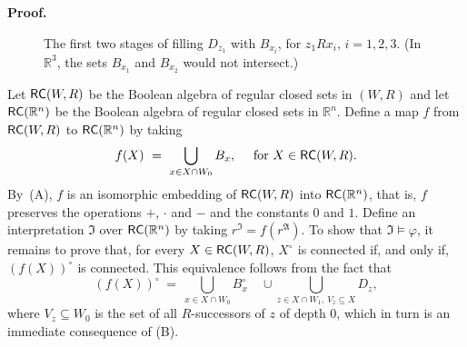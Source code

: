 \documentclass{article}
\newcommand{\R}{\mathbb{R}}
\newcommand{\RC}{{\sf RC}}
\newcommand{\ti}[2][]{{#2}^{\circ_{#1}}}
\newcommand{\qedsymbol}{\ding{113}}
\newenvironment{proof}{\par\noindent\textbf{Proof.}}{\mbox{}\hfill\qedsymbol\par\bigskip}
\begin{document}
\begin{proof}
\begin{figure}[h]
\begin{center}
\end{center}
\caption{The first two stages of filling $D_{z_1}$ with $B_{x_i}$, for $z_1 R x_i$, $i = 1,2,3$. (In $\R^3$, the sets $B_{x_1}$ and $B_{x_2}$ would not intersect.)}\label{fig:apollonian-app}
\end{figure}

Let $\RC(W,R)$ be the Boolean algebra of regular closed sets in $(W,R)$ and let $\RC(\R^n)$ be the Boolean algebra of regular closed sets in $\R^n$.
Define a map $f$ from $\RC(W,R)$ to $\RC(\R^n)$ by taking
\begin{equation*}
f(X) ~=~ \bigcup_{x\in X \cap W_0} B_x,\quad \text{ for $X \in \RC(W,R)$}.
\end{equation*}
By~(A), $f$ is an isomorphic embedding of $\RC(W,R)$ into $\RC(\R^n)$, that is, $f$ preserves
the operations $+$, $\cdot$ and $-$ and the constants $0$ and $1$.
Define an interpretation $\mathfrak{I}$ over $\RC(\R^n)$ by taking $r^\mathfrak{I} = f(r^\mathfrak{A})$. To show that $\mathfrak I \models \varphi$, it remains to prove that, for every $X \in \RC(W,R)$, $\ti{X}$ is connected if, and only if, $\ti{(f(X))}$ is connected. This equivalence follows from the fact that
\begin{equation*}
\ti{(f(X))} ~=~ \bigcup_{x\in X \cap W_0} \ti{B}_x \quad\cup \bigcup_{z\in X\cap W_1,\ V_z\subseteq X} D_z,
\end{equation*}
where $V_z\subseteq W_0$ is the set of all $R$-successors of $z$ of depth 0, which in turn is an immediate consequence of (B).
\end{proof}
\end{document}
